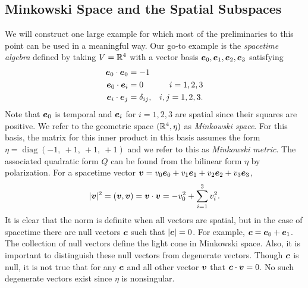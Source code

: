 \documentclass{article}
\begin{document}
\subsection{Minkowski Space and the Spatial Subspaces}
We will construct one large example for which most of the preliminaries to this point can be used in a meaningful way. Our go-to example is the \emph{spacetime algebra} defined by taking $V=\mathbb{R}^4$ with a vector basis $\boldsymbol{e}_0,\boldsymbol{e}_1,\boldsymbol{e}_2,\boldsymbol{e}_3$ satisfying
\begin{subequations}
\begin{align}
\boldsymbol{e}_0 \cdot \boldsymbol{e}_0 &= -1\\
\boldsymbol{e}_0 \cdot \boldsymbol{e}_i &= 0  &i=1,2,3\\
\boldsymbol{e}_i \cdot \boldsymbol{e}_j &= \delta_{ij}, &i,j=1,2,3.
\end{align}
\end{subequations}
Note that $\boldsymbol{e}_0$ is temporal and $\boldsymbol{e}_i$ for $i=1,2,3$ are spatial since their squares are positive. We refer to the geometric space $(\mathbb{R}^4, \eta)$ as \emph{Minkowski space}. For this basis, the matrix for this inner product in this basis assumes the form $\eta =\operatorname{diag}(-1,~ +1,~ +1,~+1)$ and we refer to this as \emph{Minkowski metric}. The associated quadratic form $Q$ can be found from the bilinear form $\eta$ by polarization. For a spacetime vector $\boldsymbol{v} = v_0 \boldsymbol{e}_0 +v_1 \boldsymbol{e}_1 + v_2 \boldsymbol{e}_2 + v_3 \boldsymbol{e}_3$,
\begin{equation}
\label{eq:spacetime_inner_product}
|\boldsymbol{v}|^2 = (\boldsymbol{v},\boldsymbol{v}) = \boldsymbol{v} \cdot \boldsymbol{v} = -v_0^2 + \sum_{i=1}^3 v_i^2.
\end{equation}
It is clear that the norm is definite when all vectors are spatial, but in the case of spacetime there are null vectors $\boldsymbol{c}$ such that $|\boldsymbol{c}|=0$. For example, $\boldsymbol{c}=\boldsymbol{e}_0 + \boldsymbol{e}_1$. The collection of null vectors define the light cone in Minkowski space. Also, it is important to distinguish these null vectors from degenerate vectors. Though $\boldsymbol{c}$ is null, it is not true that for any $\boldsymbol{c}$ and all other vector $\boldsymbol{v}$ that $\boldsymbol{c} \cdot \boldsymbol{v}=0$. No such degenerate vectors exist since $\eta$ is nonsingular.
\end{document}
